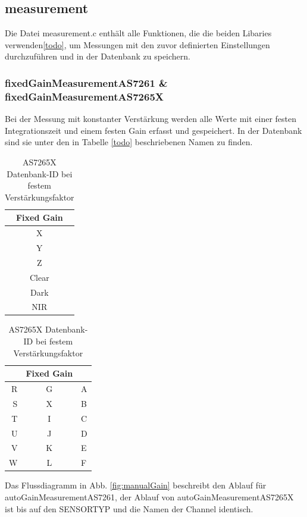 \subsection{measurement}
Die Datei measurement.c enthält alle Funktionen, die die beiden Libaries verwenden\ref{todo}, um Messungen mit den zuvor definierten Einstellungen durchzuführen und in der Datenbank zu speichern.

\subsubsection{fixedGainMeasurementAS7261 \& fixedGainMeasurementAS7265X}
Bei der Messung mit konstanter Verstärkung werden alle Werte mit einer festen Integrationszeit und einem festen Gain erfasst und gespeichert.
In der Datenbank sind sie unter den in Tabelle \ref{todo} beschriebenen Namen zu finden.

\begin{table}[H]
\parbox{.45\linewidth}{
\centering
\begin{tabular}{ c }
Fixed Gain \\
\hline
X \\ 
Y  \\
Z  \\
Clear \\ 
Dark \\ 
NIR \\ 
\end{tabular}
\caption{AS7261 Datenbank-ID bei festem Verstärkungsfaktor}
\label{auto_Datenbankname}

}
\hfill
\parbox{.45\linewidth}{
\centering
\begin{tabular}{ r c l}
&Fixed Gain \\
\hline
 	R & G & A \\  
 	S & X & B \\
 	T & I & C \\  
 	U & J & D \\
 	V & K & E \\  
 	W & L & F \\

\end{tabular}
\caption{AS7265X Datenbank-ID bei festem Verstärkungsfaktor}
\label{auto_Datenbankname}
}
\end{table}




\noindent Das Flussdiagramm in Abb. \ref{fig:manualGain} beschreibt den Ablauf für autoGainMeasurementAS7261,
der Ablauf von autoGainMeasurementAS7265X ist bis auf den SENSORTYP und die Namen der Channel identisch.

